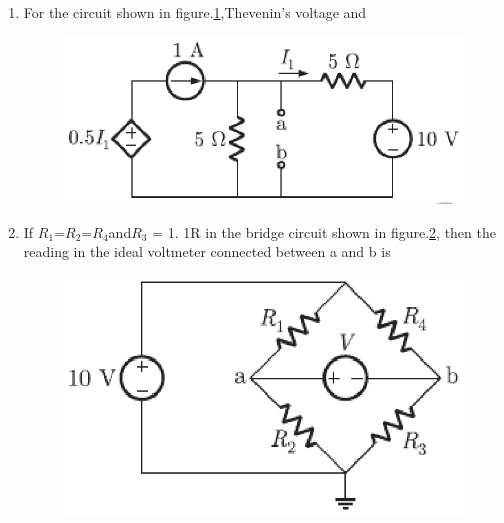 \documentclass[journal,12pt,twocolumn]{IEEEtran}
\begin{document}
\begin{enumerate}
\item For the circuit shown in figure.\ref{fig61},Thevenin’s voltage and 
\begin{enumerate}
\setlength\itemsep{2em}
\begin{figure}[!h]
\begin{center}
\includegraphics[scale=0.5]{./figs/fig61.eps}
\caption{}
\label{fig61}
\end{center}
\end{figure}
\end{enumerate}



\item If $R_{1}$=$R_{2}$=$R_{4}$and$R_{3}$ = 1. 1R in the bridge circuit shown in figure.\ref{fig62}, then the reading in the ideal voltmeter connected between a and b is
\begin{enumerate}
\setlength\itemsep{2em}
\begin{figure}[!h]
\begin{center}
\includegraphics[scale=0.5]{./figs/fig62.eps}
\caption{}
\label{fig62}
\end{center}
\end{figure}
\end{enumerate}


\end{enumerate}
\end{document}

